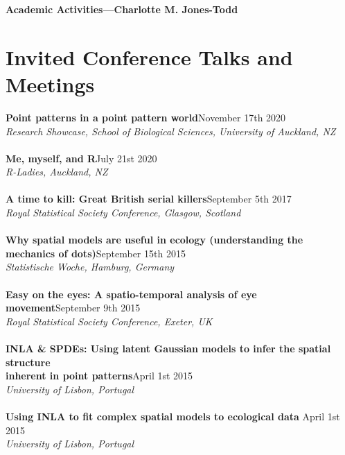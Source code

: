 \documentclass[10pt,letter]{article}
\begin{document}
\LARGE{\textbf{Academic Activities---Charlotte M. Jones-Todd}}

\normalsize

  \noindent\makebox[\linewidth]{\rule{\paperwidth}{0.4pt}}

  \section*{Invited Conference Talks and Meetings}
  \vspace{1mm}
   {\textbf{Point patterns in a point pattern world}}\hfill November 17th 2020\\
       {\sl Research Showcase, School of Biological Sciences, University of Auckland, NZ}\\
       \hdashrule[0.5ex]{4cm}{1pt}{1pt}\\
         {\textbf{Me, myself, and R}}\hfill July 21st 2020\\
         {\sl R-Ladies, Auckland, NZ}\\
         \hdashrule[0.5ex]{4cm}{1pt}{1pt}\\
         \textbf{A time to kill: Great British serial killers}\hfill  September 5th 2017\\
                {\sl Royal Statistical Society Conference, Glasgow, Scotland}\\
                \hdashrule[0.5ex]{4cm}{1pt}{1pt}\\
                \textbf{Why spatial models are useful in ecology (understanding the \\
                  mechanics of dots)}\hfill September 15th 2015\\
                       {\sl Statistische Woche, Hamburg, Germany}\\
                       \hdashrule[0.5ex]{4cm}{1pt}{1pt}\\
                       \textbf{Easy on the eyes: A spatio-temporal analysis of eye movement}\hfill September 9th 2015\\
                              {\sl Royal Statistical Society Conference, Exeter, UK}\\
                              \hdashrule[0.5ex]{4cm}{1pt}{1pt}\\
                              \textbf{INLA \& SPDEs: 
                                Using latent Gaussian models to infer the spatial structure \\
                                inherent in point patterns}\hfill April 1st 2015\\
                                     {\sl University of Lisbon, Portugal}\\
                                     \hdashrule[0.5ex]{4cm}{1pt}{1pt}\\
                                     \textbf{Using INLA to fit complex spatial models to ecological data } \hfill April 1st 2015\\
                                            {\sl University of Lisbon, Portugal}\\
\end{document}
